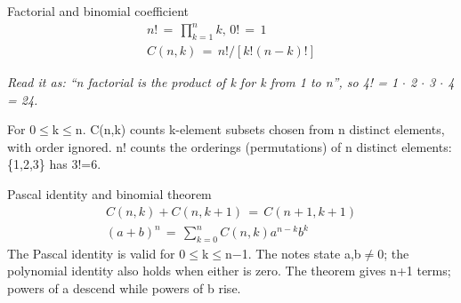 \documentclass[11pt]{article}
\begin{document}
\begin{keepsection}
\begin{equationcard}{Factorial and binomial coefficient}
\[ \begin{gathered} {n}!\, =\, \prod_{{k}=1}^{{n}} {k},\, 0!\, =\, 1 \\ {C}({n},{k})\, =\, {n}!/[{k}!({n}-{k})!] \end{gathered} \]
{\small \emph{Read it as: “n factorial is the product of k for k from 1 to n”, so 4! = 1 \ensuremath{\cdot} 2 \ensuremath{\cdot} 3 \ensuremath{\cdot} 4 = 24.}\par For 0\ensuremath{\leq}k\ensuremath{\leq}n. C(n,k) counts k-element subsets chosen from n distinct elements, with order ignored. n! counts the orderings (permutations) of n distinct elements: \{1,2,3\} has 3!=6.}
\end{equationcard}

\begin{equationcard}{Pascal identity and binomial theorem}
\[ \begin{gathered} {C}({n},{k})+{C}({n},{k}+1)\, =\, {C}({n}+1,{k}+1) \\ ({a}+{b})^{{n}}\, =\, \sum_{{k}=0}^{{n}} {C}({n},{k}){a}^{{n}-{k}}{b}^{{k}} \end{gathered} \]
{\small The Pascal identity is valid for 0\ensuremath{\leq}k\ensuremath{\leq}n\ensuremath{-}1. The notes state a,b\ensuremath{\neq}0; the polynomial identity also holds when either is zero. The theorem gives n+1 terms; powers of a descend while powers of b rise.}
\end{equationcard}


\end{keepsection}
\end{document}
